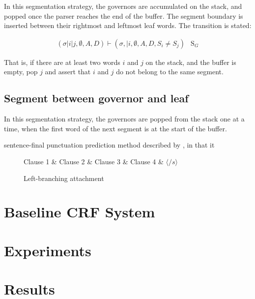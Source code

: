 \documentclass[11pt,letterpaper]{article}
\begin{document}
In this segmentation strategy, the governors are accumulated on the stack, and
popped once the parser reaches the end of the buffer.  The segment boundary is
inserted between their rightmost and leftmost leaf words.
The transition is stated:

\begin{eqnarray}
    (\sigma | i | j, \emptyset , A, D) \vdash (\sigma, | i, \emptyset, A, D, S_i \ne S_j ) & \mathrm{S}_G
\end{eqnarray}

That is, if there are at least two words $i$ and $j$ on the stack, and the buffer
is empty, pop $j$ and assert that $i$ and $j$ do not belong to the same segment.

\subsection{Segment between governor and leaf}

In this segmentation strategy, the governors are popped from the stack one at
a time, when the first word of the next segment is at the start of the buffer.

sentence-final punctuation prediction method described by \citet{zhang:13},
in that it 


\begin{figure}
\begin{dependency}[theme=simple, segmented edge]
    \begin{deptext}[column sep=.075cm, row sep=.1ex]
    Clause 1 \& Clause 2 \& Clause 3 \& Clause 4 \& $\langle /s \rangle$ \\
    \end{deptext}
    \end{dependency}
    \caption{Left-branching attachment}
\end{figure}

\clearpage
\section{Baseline CRF System}

\section{Experiments}

\section{Results}
\end{document}
